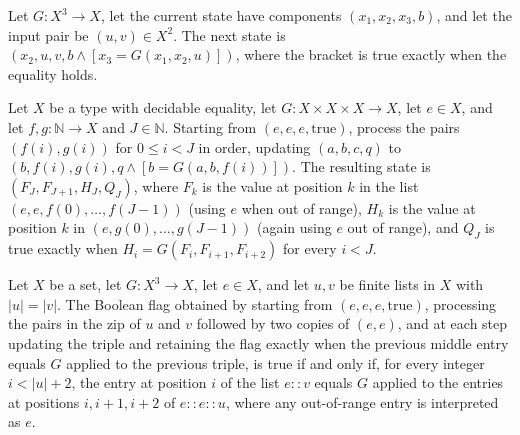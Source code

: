 \begin{definition}
\label{Complexity.Codec.slStep}
\leanok
{}
Let $G\colon X^3\to X$, let the current state have components $(x_1,x_2,x_3,b)$, and let
the input pair be $(u,v)\in X^2$. The next state is
$(x_2,u,v,b\mathbin{\wedge}[x_3=G(x_1,x_2,u)])$, where the bracket is true exactly when
the equality holds.
\end{definition}

\begin{lemma}
\label{Complexity.Codec.foldl_slStep_range}
\leanok
{}
Let $X$ be a type with decidable equality, let $G:X\times X\times X\to X$, let $e\in X$,
and let $f,g:\mathbb{N}\to X$ and $J\in\mathbb{N}$. Starting from
$(e,e,e,\mathrm{true})$, process the pairs $(f(i),g(i))$ for $0\le i<J$ in order,
updating $(a,b,c,q)$ to $(b,f(i),g(i),q\land[b=G(a,b,f(i))])$. The resulting state is
$(F_J,F_{J+1},H_J,Q_J)$, where $F_k$ is the value at position $k$ in the list
$(e,e,f(0),\ldots,f(J-1))$ (using $e$ when out of range), $H_k$ is the value at position
$k$ in $(e,g(0),\ldots,g(J-1))$ (again using $e$ out of range), and $Q_J$ is true
exactly when $H_i=G(F_i,F_{i+1},F_{i+2})$ for every $i<J$.
\end{lemma}

\begin{theorem}
\label{Complexity.Codec.slide_ok_iff}
\leanok
{}
Let $X$ be a set, let $G\colon X^3\to X$, let $e\in X$, and let $u,v$ be finite lists in
$X$ with $|u|=|v|$. The Boolean flag obtained by starting from $(e,e,e,\mathrm{true})$,
processing the pairs in the zip of $u$ and $v$ followed by two copies of $(e,e)$, and at
each step updating the triple and retaining the flag exactly when the previous middle
entry equals $G$ applied to the previous triple, is true if and only if, for every
integer $i<|u|+2$, the entry at position $i$ of the list $e::v$ equals $G$ applied to
the entries at positions $i,i+1,i+2$ of $e::e::u$, where any out-of-range entry is
interpreted as $e$.
\end{theorem}
